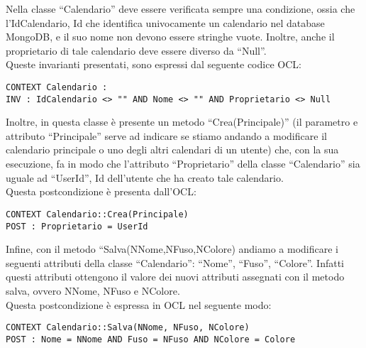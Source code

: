 \begin{listaPersonale}[OCL]{}
    Nella classe “Calendario” deve essere verificata sempre una condizione, ossia che l’IdCalendario, Id che identifica univocamente un calendario nel database MongoDB, e il suo nome non devono essere stringhe vuote. Inoltre, anche il proprietario di tale calendario deve essere diverso da “Null”.\\
    Queste invarianti presentati, sono espressi dal seguente codice OCL:
    \begin{lstlisting}
CONTEXT Calendario :
INV : IdCalendario <> "" AND Nome <> "" AND Proprietario <> Null
    \end{lstlisting}
    Inoltre, in questa classe è presente un metodo “Crea(Principale)” (il parametro e attributo “Principale” serve ad indicare se stiamo andando a modificare il calendario principale o uno degli altri calendari di un utente) che, con la sua esecuzione, fa in modo che l’attributo “Proprietario” della classe “Calendario” sia uguale ad “UserId”, Id dell’utente che ha creato tale calendario.\\
    Questa postcondizione è presenta dall’OCL:
    \begin{lstlisting}
CONTEXT Calendario::Crea(Principale)
POST : Proprietario = UserId
    \end{lstlisting}
    Infine, con il metodo “Salva(NNome,NFuso,NColore) andiamo a modificare i seguenti attributi della classe “Calendario”: “Nome”, “Fuso”, “Colore”. Infatti questi attributi ottengono il valore dei nuovi attributi assegnati con il metodo salva, ovvero NNome, NFuso e NColore. \\
    Questa postcondizione è espressa in OCL nel seguente modo:
    \begin{lstlisting}
CONTEXT Calendario::Salva(NNome, NFuso, NColore)
POST : Nome = NNome AND Fuso = NFuso AND NColore = Colore 
    \end{lstlisting}




    \begin{lstlisting}
    \end{lstlisting}




    \begin{lstlisting}
    \end{lstlisting}





\end{listaPersonale}
